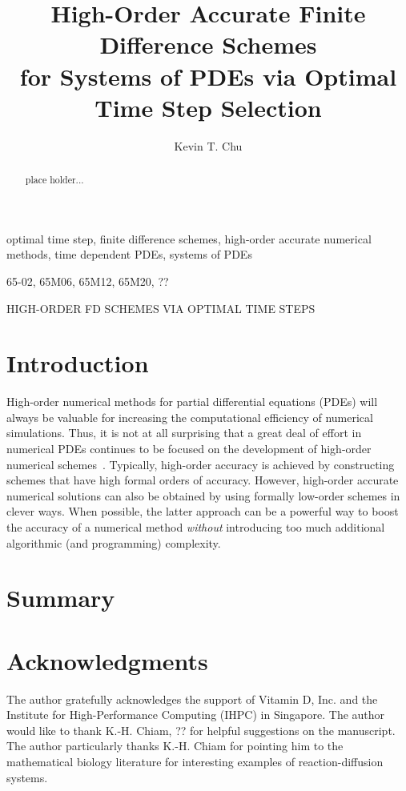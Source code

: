 \documentclass[oneeqnum,onefignum,onetabnum,onethmnum]{siamltex}
\title{High-Order Accurate Finite Difference Schemes \\
       for Systems of PDEs via Optimal Time Step Selection}
\author{
Kevin T. Chu\footnotemark[2] \footnotemark[3]
}
\begin{document}

\maketitle

\renewcommand{\thefootnote}{\fnsymbol{footnote}}

\renewcommand{\thefootnote}{\fnsymbol{footnote}}

\renewcommand{\thefootnote}{\arabic{footnote}}


\begin{abstract}
place holder...
\end{abstract}


\begin{keywords}
optimal time step, finite difference schemes, high-order accurate numerical 
methods, time dependent PDEs, systems of PDEs
\end{keywords}

\begin{AMS}
65-02, 65M06, 65M12, 65M20, ??
\end{AMS}

\pagestyle{myheadings}
\thispagestyle{plain}
         {HIGH-ORDER FD SCHEMES VIA OPTIMAL TIME STEPS}


\section*{Introduction}
High-order numerical methods for partial differential equations (PDEs) will 
always be valuable for increasing the computational efficiency of numerical 
simulations.  Thus, it is not at all surprising that a great deal of effort in 
numerical PDEs continues to be focused on the development of high-order 
numerical schemes~\cite{bruger_2005, gibou_2005, ito_2005, shukla_2005, 
shukla_2007}.  
Typically, high-order accuracy is achieved by constructing
schemes that have high formal orders of accuracy.  However, high-order 
accurate numerical solutions can also be obtained by using formally low-order 
schemes in clever ways.  When possible, the latter approach can be a powerful 
way to boost the accuracy of a numerical method \emph{without} introducing too 
much additional algorithmic (and programming) complexity.

\section{\label{sec:summary} Summary} 


\section*{Acknowledgments}
The author gratefully acknowledges the support of Vitamin D, Inc.
and the Institute for High-Performance Computing (IHPC) in Singapore. 
The author would like to thank K.-H. Chiam, ?? 
for helpful suggestions on the manuscript.  
The author particularly thanks K.-H. Chiam for pointing him to the 
mathematical biology literature for interesting examples of reaction-diffusion 
systems.


\end{document}
